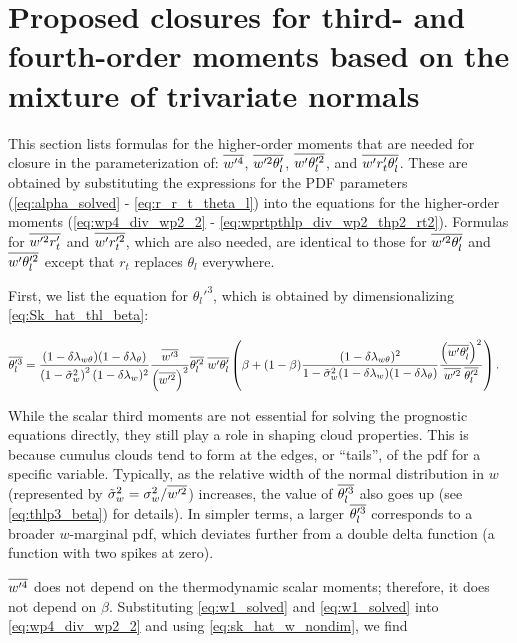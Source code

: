 \section{Proposed closures for third- and fourth-order moments based on the mixture of trivariate normals}\label{sec:prop_closure}

This section lists formulas for the higher-order moments that are needed for closure in the parameterization of: $\overline{w'^4}$, $\overline{w'^2 \theta_l'}$, $\overline{w' \theta_l'^2}$, and $\overline{w' r_t' \theta_l'}$.
These are obtained by substituting the expressions for the PDF parameters (\cref{eq:alpha_solved} - \cref{eq:r_r_t_theta_l}) into the equations for the higher-order moments (\cref{eq:wp4_div_wp2_2} - \cref{eq:wprtpthlp_div_wp2_thp2_rt2}).
Formulas for $\overline{w'^2 r_t'}$ and $\overline{w' r_t'^2}$, which are also needed, are identical to those for $\overline{w'^2 \theta_l'}$ and $\overline{w' \theta_l'^2}$ except that $r_t$ replaces $\theta_l$ everywhere.

First, we list the equation for $\theta_l'^3$, which is obtained by dimensionalizing \cref{eq:Sk_hat_thl_beta}:

\begin{align}
    \label{eq:thlp3_beta}
    \overline{\theta_l'^3}
    &= \frac{(1-\delta \lambda_{w \theta})(1-\delta \lambda_\theta)}{\left( 1 - \tilde{\sigma}_w^2 \right)^2 (1-\delta \lambda_w)^2} \frac{\overline{w'^3}}{\left( \overline{w'^2} \right)^2} \overline{\theta_l'^2} \; \overline{w'\theta_l'} \left(\beta + (1-\beta) \frac{(1-\delta \lambda_{w \theta})^2}{1-\tilde{\sigma}_w^2 (1-\delta \lambda_w)(1-\delta \lambda_\theta)} \frac{\left(\overline{w'\theta_l'}\right)^2}{\overline{w'^2} \; \overline{\theta_l'^2}}\right).
\end{align}

While the scalar third moments are not essential for solving the prognostic equations directly, they still play a role in shaping cloud properties.
This is because cumulus clouds tend to form at the edges, or \enquote{tails}, of the \gls{pdf} for a specific variable.
Typically, as the relative width of the normal distribution in $w$ (represented by ${\tilde{\sigma}_w}^2=\sigma_w^2/\overline{w'^2}$) increases, the value of $\overline{\theta_l'^3}$ also goes up (see \cref{eq:thlp3_beta}) for details).
In simpler terms, a larger $\overline{\theta_l'^3}$ corresponds to a broader $w$-marginal \gls{pdf}, which deviates further from a double delta function (a function with two spikes at zero).

$\overline{w'^4}$ does not depend on the thermodynamic scalar moments;
therefore, it does not depend on $\beta$.
Substituting \cref{eq:w1_solved} and \cref{eq:w1_solved} into \cref{eq:wp4_div_wp2_2} and using \cref{eq:sk_hat_w_nondim}, we find

